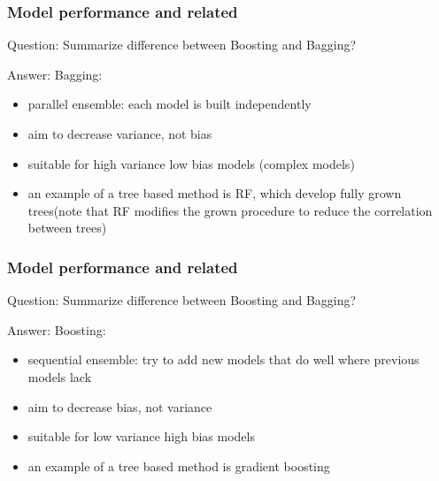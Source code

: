 \documentclass[11pt]{beamer}
\begin{document}
\begin{frame}
\frametitle{Model performance and related}
\begin{block}{Question:}
	Summarize difference between Boosting and Bagging?
\end{block}
\begin{block}{Answer:}
	Bagging:
	\begin{itemize}
		\item parallel ensemble: each model is built independently
		\item aim to decrease variance, not bias
		\item suitable for high variance low bias models (complex models)
		\item an example of a tree based method is RF, which develop fully grown trees(note that RF modifies the grown procedure to reduce the correlation between trees)
	\end{itemize}
\end{block}
\end{frame}

\begin{frame}
\frametitle{Model performance and related}
\begin{block}{Question:}
	Summarize difference between Boosting and Bagging?
\end{block}
\begin{block}{Answer:}
	Boosting:
	\begin{itemize}
		\item sequential ensemble: try to add new models that do well where previous models lack
		\item aim to decrease bias, not variance
		\item suitable for low variance high bias models
		\item an example of a tree based method is gradient boosting
	\end{itemize}
\end{block}
\end{frame}
\end{document}
